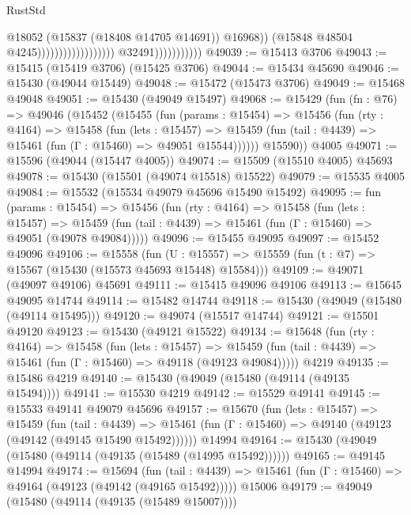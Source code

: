 \begin{lexlean}{RustStd}
\begin{coremodule}
{\begin{coremodule}
{{{{{{{{{{{{{{{{{{{{{{{{{{{{{{{{{{{{{{{{{{{{{{{{{{{{{{{{{{{{                                                                @18052
                                                                (@15837 (@18408 @14705 @14691))
                                                                @16968))
                                                            (@15848 @48504 @4245))))))))))))))))))
                          @32491)))))))))))
@49039 := @15413 @3706
@49043 := @15415 (@15419 @3706) (@15425 @3706)
@49044 := @15434 @45690
@49046 := @15430 (@49044 @15449)
@49048 := @15472 (@15473 @3706)
@49049 := @15468 @49048
@49051 := @15430 (@49049 @15497)
@49068 := @15429
    (fun (fn : @76) =>
    @49046
      (@15452
        (@15455
          (fun (params : @15454) =>
          @15456
            (fun (rty : @4164) =>
            @15458
              (fun (lets : @15457) =>
              @15459 (fun (tail : @4439) => @15461 (fun (Γ : @15460) => @49051 @15544))))))
        @15590))
    @4005
@49071 := @15596 (@49044 (@15447 @4005))
@49074 := @15509 (@15510 @4005) @45693
@49078 := @15430 (@15501 (@49074 @15518) @15522)
@49079 := @15535 @4005
@49084 := @15532 (@15534 @49079 @45696 @15490 @15492)
@49095 := fun (params : @15454) =>
  @15456
    (fun (rty : @4164) =>
    @15458
      (fun (lets : @15457) =>
      @15459 (fun (tail : @4439) => @15461 (fun (Γ : @15460) => @49051 (@49078 @49084)))))
@49096 := @15455 @49095
@49097 := @15452 @49096
@49106 := @15558
    (fun (U : @15557) => @15559 (fun (t : @7) => @15567 (@15430 (@15573 @45693 @15448) @15584)))
@49109 := @49071 (@49097 @49106) @45691
@49111 := @15415 @49096 @49106
@49113 := @15645 @49095 @14744
@49114 := @15482 @14744
@49118 := @15430 (@49049 (@15480 (@49114 @15495)))
@49120 := @49074 (@15517 @14744)
@49121 := @15501 @49120
@49123 := @15430 (@49121 @15522)
@49134 := @15648
    (fun (rty : @4164) =>
    @15458
      (fun (lets : @15457) =>
      @15459 (fun (tail : @4439) => @15461 (fun (Γ : @15460) => @49118 (@49123 @49084)))))
    @4219
@49135 := @15486 @4219
@49140 := @15430 (@49049 (@15480 (@49114 (@49135 @15494))))
@49141 := @15530 @4219
@49142 := @15529 @49141
@49145 := @15533 @49141 @49079 @45696
@49157 := @15670
    (fun (lets : @15457) =>
    @15459
      (fun (tail : @4439) =>
      @15461 (fun (Γ : @15460) => @49140 (@49123 (@49142 (@49145 @15490 @15492))))))
    @14994
@49164 := @15430 (@49049 (@15480 (@49114 (@49135 (@15489 (@14995 @15492))))))
@49165 := @49145 @14994
@49174 := @15694
    (fun (tail : @4439) => @15461 (fun (Γ : @15460) => @49164 (@49123 (@49142 (@49165 @15492)))))
    @15006
@49179 := @49049 (@15480 (@49114 (@49135 (@15489 @15007))))
}}}}}}}}}}}}}}}}}}}}}}}}}}}}}}}}}}}}}}}}}}}}}}}}}}}}}}}}}}}}
\end{coremodule}}
\end{coremodule}
\end{lexlean}
